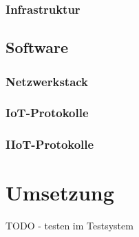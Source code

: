 \subsubsection{Infrastruktur}

\subsection{Software}
\subsubsection{Netzwerkstack}
\subsubsection{\ac{IoT}-Protokolle}
\subsubsection{\ac{IIoT}-Protokolle}

\section{Umsetzung}
TODO - testen im Testsystem